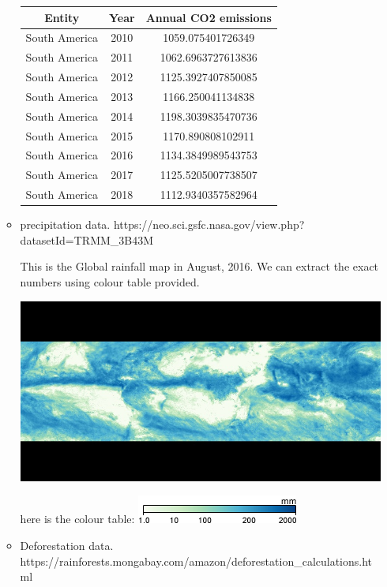 \documentclass[12pt]{article}
\begin{document}
\begin{enumerate}
\begin{itemize}
{    \begin{tabular}{ |c|c|c| }
    \hline
    Entity & Year & Annual CO2 emissions \\
    \hline
      South America & 2010 & 1059.075401726349 \\
      \hline
      South America & 2011 & 1062.6963727613836 \\
      \hline
      South America & 2012 & 1125.3927407850085 \\
      \hline
      South America & 2013 & 1166.250041134838 \\
      \hline
      South America & 2014 & 1198.3039835470736 \\
      \hline
      South America & 2015 & 1170.890808102911 \\
      \hline
      South America & 2016 & 1134.3849989543753 \\
      \hline
      South America & 2017 & 1125.5205007738507 \\
      \hline
      South America & 2018 & 1112.9340357582964 \\
      \hline
    \end{tabular}
 
  }
  \item
  {
    precipitation data. https://neo.sci.gsfc.nasa.gov/view.php?datasetId=TRMM\_3B43M

    This is the Global rainfall map in August, 2016. We can extract the exact numbers using colour table provided.

    \includegraphics[scale = 0.6]{Global-rainfall-Aug2016.png}

    here is the colour table: \includegraphics{Global-rainfall-Aug2016-table.png}
  }
  \item
  {
    Deforestation data. https://rainforests.mongabay.com/amazon/deforestation\_calculations.html

}
\end{itemize}
\end{enumerate}
\end{document}
